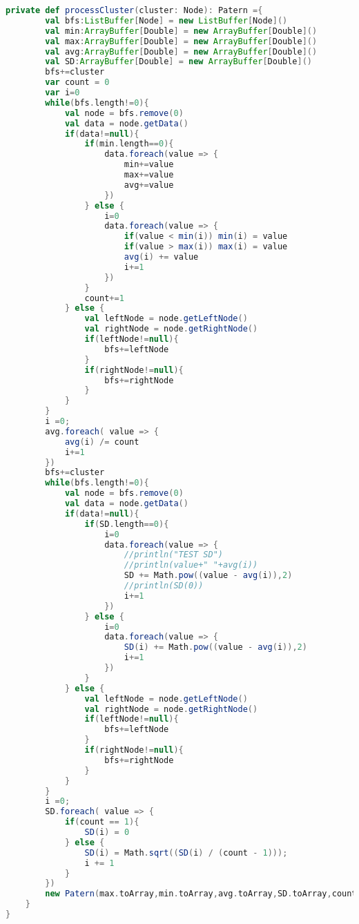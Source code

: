 \begin{lstlisting}[language=Scala, caption=Cluster.scala]
    private def processCluster(cluster: Node): Patern ={
        val bfs:ListBuffer[Node] = new ListBuffer[Node]()
        val min:ArrayBuffer[Double] = new ArrayBuffer[Double]()
        val max:ArrayBuffer[Double] = new ArrayBuffer[Double]()
        val avg:ArrayBuffer[Double] = new ArrayBuffer[Double]()
        val SD:ArrayBuffer[Double] = new ArrayBuffer[Double]()
        bfs+=cluster
        var count = 0
        var i=0
        while(bfs.length!=0){
            val node = bfs.remove(0)
            val data = node.getData()
            if(data!=null){
                if(min.length==0){
                    data.foreach(value => {
                        min+=value
                        max+=value
                        avg+=value
                    })
                } else {
                    i=0
                    data.foreach(value => {
                        if(value < min(i)) min(i) = value
                        if(value > max(i)) max(i) = value
                        avg(i) += value
                        i+=1
                    })
                }
                count+=1
            } else {
                val leftNode = node.getLeftNode()
                val rightNode = node.getRightNode()
                if(leftNode!=null){
                    bfs+=leftNode
                }
                if(rightNode!=null){
                    bfs+=rightNode
                }
            }
        }
        i =0;
        avg.foreach( value => {
            avg(i) /= count
            i+=1
        })
        bfs+=cluster
        while(bfs.length!=0){
            val node = bfs.remove(0)
            val data = node.getData()
            if(data!=null){
                if(SD.length==0){
                    i=0
                    data.foreach(value => {
                        //println("TEST SD")
                        //println(value+" "+avg(i))
                        SD += Math.pow((value - avg(i)),2)
                        //println(SD(0))
                        i+=1
                    })
                } else {
                    i=0
                    data.foreach(value => {
                        SD(i) += Math.pow((value - avg(i)),2)
                        i+=1
                    })
                }
            } else {
                val leftNode = node.getLeftNode()
                val rightNode = node.getRightNode()
                if(leftNode!=null){
                    bfs+=leftNode
                }
                if(rightNode!=null){
                    bfs+=rightNode
                }
            }
        }
        i =0;
        SD.foreach( value => {
            if(count == 1){
                SD(i) = 0
            } else {
                SD(i) = Math.sqrt((SD(i) / (count - 1)));
                i += 1
            }
        })
        new Patern(max.toArray,min.toArray,avg.toArray,SD.toArray,count)
    }
}
\end{lstlisting}

